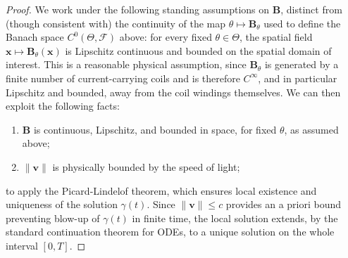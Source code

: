 \documentclass{article}
\begin{document}
	\begin{proof}
		
		We work under the following standing assumptions on $\mathbf{B}$, distinct from (though consistent with) the continuity of the map $\theta \mapsto \mathbf{B}_\theta$ used to define the Banach space $C^0(\Theta, \mathcal{F})$ above: for every fixed $\theta \in \Theta$, the spatial field $\mathbf{x} \mapsto \mathbf{B}_\theta(\mathbf{x})$ is Lipschitz continuous and bounded on the spatial domain of interest. This is a reasonable physical assumption, since $\mathbf{B}_\theta$ is generated by a finite number of current-carrying coils and is therefore $C^\infty$, and in particular Lipschitz and bounded, away from the coil windings themselves. We can then exploit the following facts:
		\begin{enumerate}
			\item $\mathbf{B}$ is continuous, Lipschitz, and bounded in space, for fixed $\theta$, as assumed above;
			\item $\| \mathbf{v} \|$ is physically bounded by the speed of light;
		\end{enumerate}  
		to apply the Picard-Lindelof theorem, which ensures local existence and uniqueness of the solution $\gamma(t)$. Since $\|\mathbf{v}\| \le c$ provides an a priori bound preventing blow-up of $\gamma(t)$ in finite time, the local solution extends, by the standard continuation theorem for ODEs, to a unique solution on the whole interval $[0,T]$.
		

\end{proof}
\end{document}
